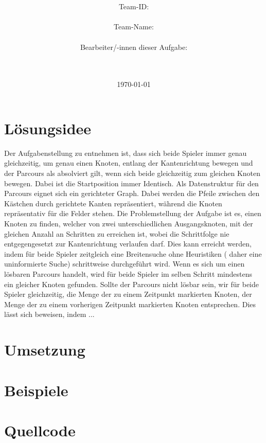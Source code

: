 \documentclass[a4paper,10pt,ngerman]{scrartcl}
\title{\textbf{\Huge\Aufgabe}}
\author{\LARGE Team-ID: \LARGE \TeamId \\\\
\LARGE Team-Name: \LARGE \TeamName \\\\
\LARGE Bearbeiter/-innen dieser Aufgabe: \\
\LARGE \Namen\\\\}
\date{\LARGE\today}
\begin{document}
    \maketitle
    \tableofcontents

    \vspace{0.5cm}

    \section{Lösungsidee}\label{sec:losungsidee}
    Der Aufgabenstellung zu entnehmen ist,
    dass sich beide Spieler immer genau gleichzeitig,
    um genau einen Knoten,
    entlang der Kantenrichtung bewegen und der Parcours als absolviert gilt,
    wenn sich beide gleichzeitig zum gleichen Knoten bewegen.
    Dabei ist die Startposition immer Identisch.
    Als Datenstruktur für den Parcours eignet sich ein gerichteter Graph.
    Dabei werden die Pfeile zwischen den Kästchen durch gerichtete Kanten repräsentiert,
    während die Knoten repräsentativ für die Felder stehen.
    Die Problemstellung der Aufgabe ist es,
    einen Knoten zu finden,
    welcher von zwei unterschiedlichen Ausgangsknoten,
    mit der gleichen Anzahl an Schritten zu erreichen ist,
    wobei die Schrittfolge nie entgegengesetzt zur Kantenrichtung verlaufen darf.
    Dies kann erreicht werden,
    indem für beide Spieler zeitgleich eine Breitensuche ohne Heuristiken ( daher eine uninformierte Suche) schrittweise durchgeführt wird.
    Wenn es sich um einen lösbaren Parcours handelt,
    wird für beide Spieler im selben Schritt mindestens ein gleicher Knoten gefunden.
    Sollte der Parcours nicht lösbar sein,
    wir für beide Spieler gleichzeitig,
    die Menge der zu einem Zeitpunkt markierten Knoten,
    der Menge der zu einem vorherigen Zeitpunkt markierten Knoten entsprechen.
    Dies lässt sich beweisen, indem ...


    \section{Umsetzung}\label{sec:umsetzung}


    \section{Beispiele}\label{sec:beispiele}


    \section{Quellcode}\label{sec:quellcode}\label{LastPage}
\end{document}
